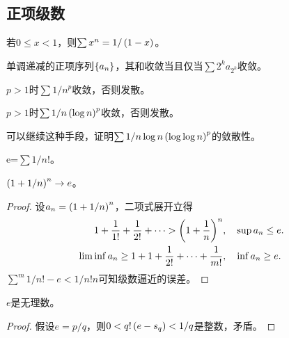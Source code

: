 \documentclass{ctexrep}
\begin{document}
  \subsection{正项级数}
  \begin{theorem}
    若$0\le x<1$，则$\sum x^n = 1/\left(1-x\right)$。
  \end{theorem}
  \begin{theorem}
    单调递减的正项序列$\left\{a_n\right\}$，其和收敛当且仅当$\sum 2^ka_{2^k}$收敛。
  \end{theorem}
  \begin{corollary}
    $p>1$时$\sum 1/n^p$收敛，否则发散。
  \end{corollary}
  \begin{corollary}
    $p>1$时$\sum 1/n\left(\log n\right)^p$收敛，否则发散。
  \end{corollary}
  可以继续这种手段，证明$\sum 1/n \log n \left(\log \log n\right)^p$的敛散性。
  \begin{definition}
    e=$\sum 1/n!$。
  \end{definition}
  \begin{theorem}
    $\left(1+1/n\right)^n\rightarrow e$。
  \end{theorem}
  \begin{proof}
    设$a_n=\left(1+1/n\right)^n$，二项式展开立得
    \begin{align*}
    1+\frac{1}{1!} + \frac{1}{2!}+\cdots > \left(1+\frac{1}{n}\right)^n&, \quad \sup a_n \le e.\\
    \lim\inf a_n \ge 1+1+\frac{1}{2!}+\cdots + \frac{1}{m!}&, \quad \inf a_n \ge e. \qedhere
    \end{align*}
    $\sum^m 1/n!-e < 1/n!n$可知级数逼近的误差。
  \end{proof}
  \begin{theorem}
    $e$是无理数。
  \end{theorem}
  \begin{proof}
    假设$e=p/q$，则$0<q!\left(e-s_q\right)<1/q$是整数，矛盾。
  \end{proof}
\end{document}
